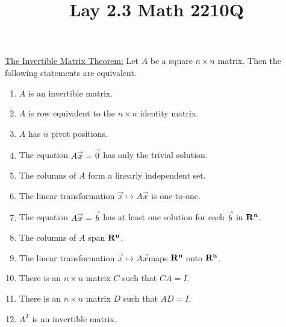 \documentclass{ximera}
\newcommand{\RR}{\bf R}
\begin{document}
  	\title{Lay 2.3  \hfill Math 2210Q} 

  	
  
 \underline{The Invertible Matrix Theorem:} Let $A$ be a square $n \times n$ matrix. Then the following statements are equivalent.
 \begin{enumerate}
 	\item $A$ is an invertible matrix.
 	\item $A$ is row equivalent to the $n \times n$ identity matrix.
 	\item $A$ has $n$ pivot positions.
 	\item The equation $A\vec{x} = \vec{0}$ has only the trivial solution.
 	\item The columns of $A$ form a linearly independent set.
 	\item The linear transformation $\vec{x} \mapsto A\vec{x}$ is one-to-one.
 	\item The equation $A\vec{x} = \vec{b}$ has at least one solution for each $\vec{b}$ in $\RR^n$.
 	\item The columns of $A$ span $\RR^n$.
 	\item The linear transformation $\vec{x} \mapsto A\vec{x}$maps $\RR^n$ onto $\RR^n$.
 	\item There is an $n \times n$ matrix $C$ such that $CA =I$.
 	\item There is an $n\times n$ matrix $D$ such that $AD = I$.
 	\item $A^T$ is an invertible matrix.
 \end{enumerate}
 
\end{document}
